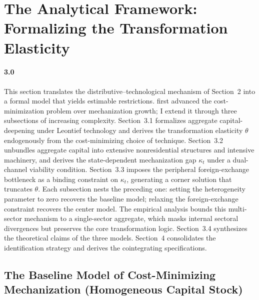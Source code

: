 \section{The Analytical Framework: Formalizing the
	Transformation Elasticity}
\label{sec:3:analytical_framework}

\paragraph{3.0}
This section translates the distributive--technological
mechanism of Section~2 into a formal model that yields
estimable restrictions. \citet{CajasGuajirro2024} first
advanced the cost-minimization problem over mechanization
growth; I extend it through three subsections of
increasing complexity. Section~3.1 formalizes aggregate
capital-deepening under Leontief technology and derives
the transformation elasticity $\theta$ endogenously from
the cost-minimizing choice of technique. Section~3.2
unbundles aggregate capital into extensive nonresidential
structures and intensive machinery, and derives the
state-dependent mechanization gap $\kappa_t$ under a
dual-channel viability condition. Section~3.3 imposes the
peripheral foreign-exchange bottleneck as a binding
constraint on $\kappa_t$, generating a corner solution
that truncates $\theta$. Each subsection nests the
preceding one: setting the heterogeneity parameter to
zero recovers the baseline model; relaxing the
foreign-exchange constraint recovers the center model.
The empirical analysis bounds this multi-sector mechanism
to a single-sector aggregate, which masks internal
sectoral divergences but preserves the core transformation
logic. Section~3.4 synthesizes the theoretical claims of
the three models. Section~4 consolidates the
identification strategy and derives the cointegrating
specifications.

\subsection{The Baseline Model of Cost-Minimizing
	Mechanization (Homogeneous Capital Stock)}

